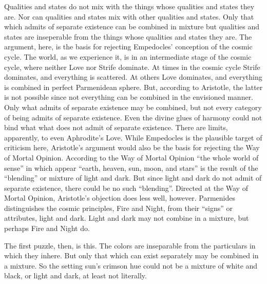 Qualities and states do not mix with the things whose qualities and states they are. Nor can qualities and states mix with other qualities and states. Only that which admits of separate existence can be combined in mixture but qualities and states are inseperable from the things whose qualities and states they are. The argument, here, is the basis for rejecting Empedocles' conception of the cosmic cycle. The world, as we experience it, is in an intermediate stage of the cosmic cycle, where neither Love nor Strife dominate. At times in the cosmic cycle Strife dominates, and everything is scattered. At others Love dominates, and everything is combined in perfect Parmenidean sphere. But, according to Aristotle, the latter is not possible since not everything can be combined in the envisioned manner. Only what admits of separate existence may be combined, but not every category of being admits of separate existence. Even the divine glues of harmony could not bind what what does not admit of separate existence. There are limits, apparently, to even Aphrodite's Love. While Empedocles is the plausible target of criticism here, Aristotle's argument would also be the basis for rejecting the Way of Mortal Opinion. According to the Way of Mortal Opinion ``the whole world of sense'' in which appear ``earth, heaven, sun, moon, and stars'' is the result of the ``blending'' or mixture of light and dark. But since light and dark do not admit of separate existence, there could be no such ``blending''. Directed at the Way of Mortal Opinion, Aristotle's objection does less well, however. Parmenides distinguishes the cosmic principles, Fire and Night, from their ``signs'' or attributes, light and dark. Light and dark may not combine in a mixture, but perhaps Fire and Night do.

The first puzzle, then, is this. The colors are inseparable from the particulars in which they inhere. But only that which can exist separately may be combined in a mixture. So the setting sun's crimson hue could not be a mixture of white and black, or light and dark, at least not literally.


